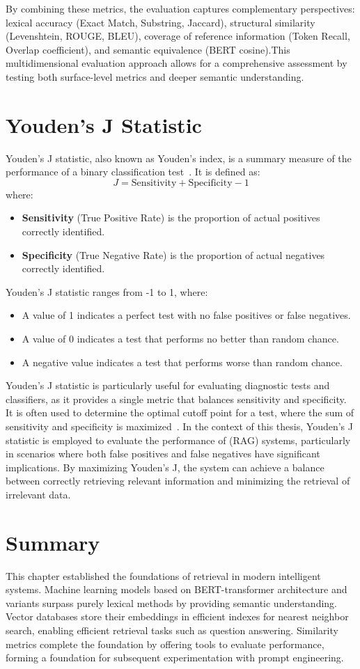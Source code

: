 By combining these metrics, the evaluation captures complementary perspectives:  
lexical accuracy (Exact Match, Substring, Jaccard), structural similarity (Levenshtein, ROUGE, BLEU), coverage of reference information (Token Recall, Overlap coefficient), and semantic equivalence (\gls{BERT} cosine).This multidimensional evaluation approach allows for a comprehensive assessment by testing both surface-level metrics and deeper semantic understanding.

\section{Youden's J Statistic}
\label{sec:youden}
Youden's J statistic, also known as Youden's index, is a summary measure of the performance of a binary classification test~\cite{youden1950index}. It is defined as:
\[
J = \text{Sensitivity} + \text{Specificity} - 1
\]
where:
\begin{itemize}
    \item \textbf{Sensitivity} (True Positive Rate) is the proportion of actual positives correctly identified.
    \item \textbf{Specificity} (True Negative Rate) is the proportion of actual negatives correctly identified.
\end{itemize}
Youden's J statistic ranges from -1 to 1, where:
\begin{itemize}
    \item A value of 1 indicates a perfect test with no false positives or false negatives.
    \item A value of 0 indicates a test that performs no better than random chance.
    \item A negative value indicates a test that performs worse than random chance.
\end{itemize}
Youden's J statistic is particularly useful for evaluating diagnostic tests and classifiers, as it provides a single metric that balances sensitivity and specificity. It is often used to determine the optimal cutoff point for a test, where the sum of sensitivity and specificity is maximized~\cite{fluss2005youden}.
In the context of this thesis, Youden's J statistic is employed to evaluate the performance of (\gls{RAG}) systems, particularly in scenarios where both false positives and false negatives have significant implications. By maximizing Youden's J, the system can achieve a balance between correctly retrieving relevant information and minimizing the retrieval of irrelevant data.
\section{Summary}
This chapter established the foundations of retrieval in modern intelligent systems. Machine learning models based on \gls{BERT}-transformer \cite{bertpretrainingdeepbidirectional} architecture and variants surpass purely lexical methods by providing semantic understanding. Vector databases store their embeddings in efficient indexes for nearest neighbor search, enabling efficient retrieval tasks such as question answering. Similarity metrics complete the foundation by offering tools to evaluate performance, forming a foundation for subsequent experimentation with prompt engineering.


